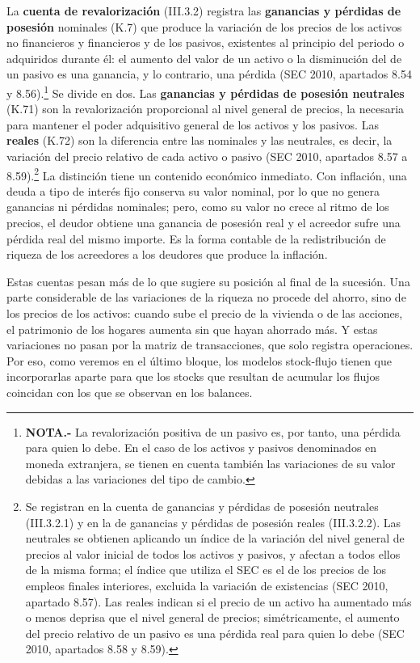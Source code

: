 \documentclass[10pt,a4paper]{article}
\begin{document}
La \textbf{cuenta de revalorización} (III.3.2) registra las \textbf{ganancias y pérdidas de posesión} nominales (K.7) que produce la variación de los precios de los activos no financieros y financieros y de los pasivos, existentes al principio del periodo o adquiridos durante él: el aumento del valor de un activo o la disminución del de un pasivo es una ganancia, y lo contrario, una pérdida (SEC 2010, apartados 8.54 y 8.56).\footnote{%
    \textbf{NOTA.-} La revalorización positiva de un pasivo es, por tanto, una pérdida para quien lo debe. En el caso de los activos y pasivos denominados en moneda extranjera, se tienen en cuenta también las variaciones de su valor debidas a las variaciones del tipo de cambio.
} Se divide en dos. Las \textbf{ganancias y pérdidas de posesión neutrales} (K.71) son la revalorización proporcional al nivel general de precios, la necesaria para mantener el poder adquisitivo general de los activos y los pasivos. Las \textbf{reales} (K.72) son la diferencia entre las nominales y las neutrales, es decir, la variación del precio relativo de cada activo o pasivo (SEC 2010, apartados 8.57 a 8.59).\footnote{%
    Se registran en la cuenta de ganancias y pérdidas de posesión neutrales (III.3.2.1) y en la de ganancias y pérdidas de posesión reales (III.3.2.2). Las neutrales se obtienen aplicando un índice de la variación del nivel general de precios al valor inicial de todos los activos y pasivos, y afectan a todos ellos de la misma forma; el índice que utiliza el SEC es el de los precios de los empleos finales interiores, excluida la variación de existencias (SEC 2010, apartado 8.57). Las reales indican si el precio de un activo ha aumentado más o menos deprisa que el nivel general de precios; simétricamente, el aumento del precio relativo de un pasivo es una pérdida real para quien lo debe (SEC 2010, apartados 8.58 y 8.59).
} La distinción tiene un contenido económico inmediato. Con inflación, una deuda a tipo de interés fijo conserva su valor nominal, por lo que no genera ganancias ni pérdidas nominales; pero, como su valor no crece al ritmo de los precios, el deudor obtiene una ganancia de posesión real y el acreedor sufre una pérdida real del mismo importe. Es la forma contable de la redistribución de riqueza de los acreedores a los deudores que produce la inflación.

Estas cuentas pesan más de lo que sugiere su posición al final de la sucesión. Una parte considerable de las variaciones de la riqueza no procede del ahorro, sino de los precios de los activos: cuando sube el precio de la vivienda o de las acciones, el patrimonio de los hogares aumenta sin que hayan ahorrado más. Y estas variaciones no pasan por la matriz de transacciones, que solo registra operaciones. Por eso, como veremos en el último bloque, los modelos stock-flujo tienen que incorporarlas aparte para que los stocks que resultan de acumular los flujos coincidan con los que se observan en los balances.
\end{document}
